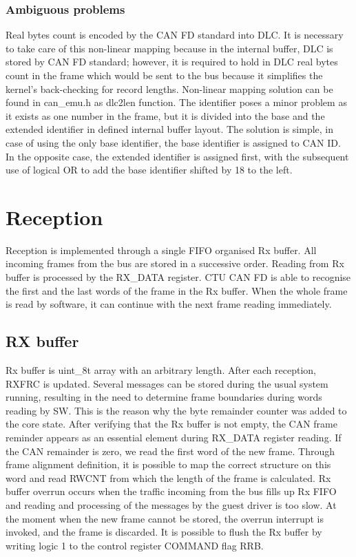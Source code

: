 \documentclass{ctuthesis}
\begin{document}
  \subsubsection{Ambiguous problems}
   Real bytes count is encoded by the CAN FD standard into DLC. It is necessary to take care of this non-linear mapping because in the internal buffer, DLC is stored by CAN FD standard; however, it is required to hold in DLC real bytes count in the frame which would be sent to the bus because it simplifies the kernel's back-checking for record lengths. Non-linear mapping solution can be found in can\_emu.h as dlc2len function. The identifier poses a minor problem as it exists as one number in the frame, but it is divided into the base and the extended identifier in defined internal buffer layout. The solution is simple, in case of using the only base identifier, the base identifier is assigned to CAN ID. In the opposite case, the extended identifier is assigned first, with the subsequent use of logical OR to add the base identifier shifted by 18 to the left. 
   
 \section{Reception}
  Reception is implemented through a single FIFO organised Rx buffer. All incoming frames from the bus are stored in a successive order. Reading from Rx buffer is processed by the RX\_DATA register. CTU CAN FD is able to recognise the first and the last words of the frame in the Rx buffer. When the whole frame is read by software, it can continue with the next frame reading immediately.

 \subsection{RX buffer}
  Rx buffer is uint\_8t array with an arbitrary length. After each reception, RXFRC is updated. Several messages can be stored during the usual system running, resulting in the need to determine frame boundaries during words reading by SW. This is the reason why the byte remainder counter was added to the core state. After verifying that the Rx buffer is not empty, the CAN frame reminder appears as an essential element during RX\_DATA register reading. If the CAN remainder is zero, we read the first word of the new frame. Through frame alignment definition, it is possible to map the correct structure on this word and read RWCNT from which the length of the frame is calculated. Rx buffer overrun occurs when the traffic incoming from the bus fills up Rx FIFO and reading and processing of the messages by the guest driver is too slow. At the moment when the new frame cannot be stored, the overrun interrupt is invoked, and the frame is discarded. It is possible to flush the Rx buffer by writing logic 1 to the control register COMMAND flag RRB. 
 
\end{document}
